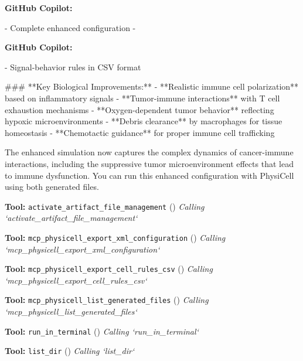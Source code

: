 \documentclass[11pt,a4paper]{article}
\begin{document}
\begin{copilotbox}
\textbf{GitHub Copilot:}

- Complete enhanced configuration
-

\end{copilotbox}
\begin{copilotbox}
\textbf{GitHub Copilot:}

- Signal-behavior rules in CSV format

\#\#\# **Key Biological Improvements:**
- **Realistic immune cell polarization** based on inflammatory signals
- **Tumor-immune interactions** with T cell exhaustion mechanisms  
- **Oxygen-dependent tumor behavior** reflecting hypoxic microenvironments
- **Debris clearance** by macrophages for tissue homeostasis
- **Chemotactic guidance** for proper immune cell trafficking

The enhanced simulation now captures the complex dynamics of cancer-immune interactions, including the suppressive tumor microenvironment effects that lead to immune dysfunction. You can run this enhanced configuration with PhysiCell using both generated files.

\end{copilotbox}
\begin{toolokbox}
\textbf{Tool:} \texttt{activate\_artifact\_file\_management} (\checkmark)
\textit{Calling `activate\_artifact\_file\_management`}
\end{toolokbox}
\begin{toolokbox}
\textbf{Tool:} \texttt{mcp\_physicell\_export\_xml\_configuration} (\checkmark)
\textit{Calling `mcp\_physicell\_export\_xml\_configuration`}
\end{toolokbox}
\begin{toolokbox}
\textbf{Tool:} \texttt{mcp\_physicell\_export\_cell\_rules\_csv} (\checkmark)
\textit{Calling `mcp\_physicell\_export\_cell\_rules\_csv`}
\end{toolokbox}
\begin{toolokbox}
\textbf{Tool:} \texttt{mcp\_physicell\_list\_generated\_files} (\checkmark)
\textit{Calling `mcp\_physicell\_list\_generated\_files`}
\end{toolokbox}
\begin{toolokbox}
\textbf{Tool:} \texttt{run\_in\_terminal} (\checkmark)
\textit{Calling `run\_in\_terminal`}
\end{toolokbox}
\begin{toolokbox}
\textbf{Tool:} \texttt{list\_dir} (\checkmark)
\textit{Calling `list\_dir`}
\end{toolokbox}
\end{document}
